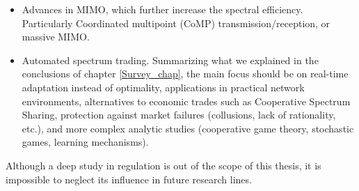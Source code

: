 \begin{itemize}
\item Advances in MIMO, which further increase the spectral efficiency. Particularly Coordinated multipoint (CoMP) transmission/reception, or massive MIMO.
\item Automated spectrum trading. Summarizing what we explained in the conclusions of chapter \ref{Survey_chap}, the main focus should be on real-time adaptation instead of optimality, applications in practical network environments, alternatives to economic trades such as Cooperative Spectrum Sharing, protection against market failures (collusions, lack of rationality, etc.), and more complex analytic studies (cooperative game theory, stochastic games, learning mechanisms). 
\end{itemize}

Although a deep study in regulation is out of the scope of this thesis, it is impossible to neglect its influence in future research lines. 

